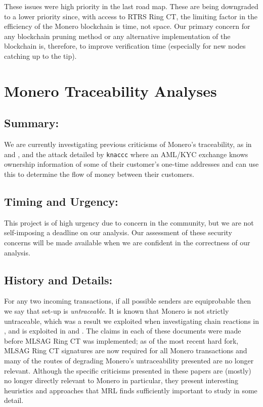 \documentclass[12pt,english]{mrl}
\theoremstyle{definition}
\numberwithin{equation}{section}
\numberwithin{figure}{section}
\numberwithin{equation}{section}
\numberwithin{equation}{section}
\numberwithin{figure}{section}
\begin{document}
These issues were high priority in the last road map. These are being downgraded to a lower priority since, with access to RTRS Ring CT, the limiting factor in the efficiency of the Monero blockchain is time, not space. Our primary concern for any blockchain pruning method or any alternative implementation of the blockchain is, therefore, to improve verification time (especially for new nodes catching up to the tip).



\section{Monero Traceability Analyses}

\subsection{Summary:} 

We are currently investigating previous criticisms of Monero's traceability, as in \cite{miller2017empirical} and \cite{kumar2017traceability}, and the attack detailed by \texttt{knaccc}  where an AML/KYC exchange knows ownership information of some of their customer's one-time addresses and can use this to determine the flow of money between their customers.

\subsection{Timing and Urgency:} 

This project is of high urgency due to concern in the community, but we are not self-imposing a deadline on our analysis. Our assessment of these security concerns will be made available when we are confident in the correctness of our analysis.

\subsection{History and Details:} 

For any two incoming transactions, if all possible senders are equiprobable then we say that set-up is \textit{untraceable}. It is known that Monero is not strictly untraceable, which was a result we exploited when investigating chain reactions in \cite{noether2014note}, and is exploited in \cite{miller2017empirical} and \cite{kumar2017traceability}. The claims in each of these documents were made before MLSAG Ring CT was implemented; as of the most recent hard fork, MLSAG Ring CT signatures are now required for all Monero transactions and many of the routes of degrading Monero's untraceability presented are no longer relevant. Although the specific criticisms presented in these papers are (mostly) no longer directly relevant to Monero in particular, they present interesting heuristics and approaches that MRL finds sufficiently important to study in some detail.
\end{document}
